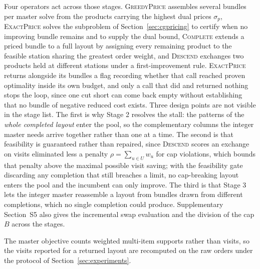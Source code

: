 \documentclass[]{interact}
\begin{document}
Four operators act across those stages. \textsc{GreedyPrice} assembles several bundles per master solve from the products carrying the highest dual prices $\sigma_p$, \textsc{ExactPrice} solves the subproblem of Section~\ref{sec:cgpricing} to certify when no improving bundle remains and to supply the dual bound, \textsc{Complete} extends a priced bundle to a full layout by assigning every remaining product to the feasible station sharing the greatest order weight, and \textsc{Descend} exchanges two products held at different stations under a first-improvement rule. \textsc{ExactPrice} returns alongside its bundles a flag recording whether that call reached proven optimality inside its own budget, and only a call that did and returned nothing stops the loop, since one cut short can come back empty without establishing that no bundle of negative reduced cost exists. Three design points are not visible in the stage list. The first is why Stage 2 resolves the stall: the patterns of the \emph{whole completed layout} enter the pool, so the complementary columns the integer master needs arrive together rather than one at a time. The second is that feasibility is guaranteed rather than repaired, since \textsc{Descend} scores an exchange on visits eliminated less a penalty $\rho = \sum_{u \in U} w_u$ for cap violations, which bounds that penalty above the maximal possible visit saving; with the feasibility gate discarding any completion that still breaches a limit, no cap-breaking layout enters the pool and the incumbent can only improve. The third is that Stage 3 lets the integer master reassemble a layout from bundles drawn from different completions, which no single completion could produce. Supplementary Section~S5 also gives the incremental swap evaluation and the division of the cap $B$ across the stages.

The master objective counts weighted multi-item supports rather than visits, so the visits reported for a returned layout are recomputed on the raw orders under the protocol of Section~\ref{sec:experiments}.
\end{document}
